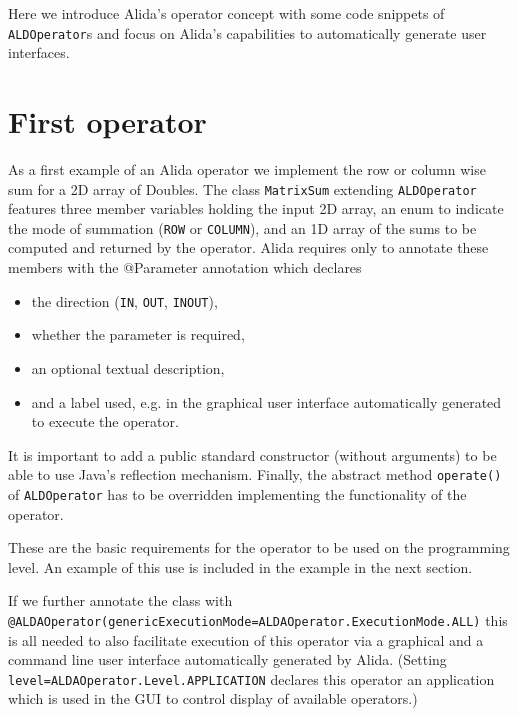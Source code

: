 Here we introduce Alida's operator concept with some code snippets of \lstinline+ALDOperator+s
and focus on Alida's capabilities to automatically generate user interfaces.

\section{First operator}

As a first example of an Alida operator we implement the row or column wise
sum for a 2D array of Doubles.
The class \lstinline+MatrixSum+ extending \lstinline+ALDOperator+ features three member variables
holding the input 2D array, an enum to indicate the mode of summation (\lstinline+ROW+ or \lstinline+COLUMN+), and
an 1D array of the sums to be computed and returned by the operator.
Alida requires only to annotate these members with the @Parameter annotation
which declares 
\begin{itemize}
	\item the direction (\lstinline+IN+, \lstinline+OUT+, \lstinline+INOUT+), 
	\item whether the parameter is required,
	\item an optional textual description,
	\item and a label used, e.g. in the graphical user interface automatically generated
		to execute the operator.
\end{itemize}
It is important to add a public standard constructor (without arguments)
to be able to use Java's reflection mechanism.
Finally, the abstract method \lstinline+operate()+ of \lstinline+ALDOperator+ has to be overridden
implementing the functionality of the operator.

\renewcommand{\codefile}{../../../../../../src/main/java/de/unihalle/informatik/Alida/demo/MatrixSum.java}
\addtocounter{off}{46}


These are the basic requirements for the operator to be used on the programming level.
An example of this use is included in the example in the next section.

If we further annotate the class with \lstinline+@ALDAOperator(genericExecutionMode=ALDAOperator.ExecutionMode.ALL)+
this is all needed to also facilitate 
execution of this operator via a graphical and a command line user interface
automatically generated by Alida.
(Setting \lstinline+level=ALDAOperator.Level.APPLICATION+ declares this operator an application
which is used in the GUI to control display of available operators.)


